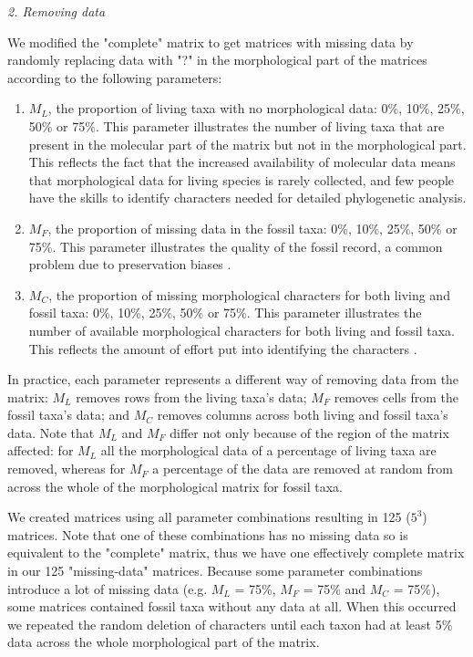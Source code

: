 \documentclass[12pt,letterpaper]{article}
\renewcommand{\subsection}[1]{%
\bigskip
\begin{center}
\begin{large}
\normalfont\itshape #1
\end{large}
\end{center}}
\begin{document}

\subsection{2. Removing data}
\label{Removing_data}
We modified the "complete" matrix to get matrices with missing data by randomly replacing data with "?" in the morphological part of the matrices according to the following parameters:
\begin{enumerate}
\item{$M_{L}$, the proportion of living taxa with no morphological data: 0\%, 10\%, 25\%, 50\% or 75\%.}
This parameter illustrates the number of living taxa that are present in the molecular part of the matrix but not in the morphological part. This reflects the fact that the increased availability of molecular data means that morphological data for living species is rarely collected, and few people have the skills to identify characters needed for detailed phylogenetic analysis.
\item{$M_{F}$, the proportion of missing data in the fossil taxa: 0\%, 10\%, 25\%, 50\% or 75\%.}
This parameter illustrates the quality of the fossil record, a common problem due to preservation biases \citep{sansomfossilization2013}. 
\item{$M_{C}$, the proportion of missing morphological characters for both living and fossil taxa: 0\%, 10\%, 25\%, 50\% or 75\%. }
This parameter illustrates the number of available morphological characters for both living and fossil taxa. This reflects the amount of effort put into identifying the characters \citep[e.g.][]{O'Leary08022013}.
\end{enumerate}

In practice, each parameter represents a different way of removing data from the matrix: $M_{L}$ removes rows from the living taxa's data; $M_{F}$ removes cells from the fossil taxa's data; and $M_{C}$ removes columns across both living and fossil taxa's data. Note that $M_{L}$ and $M_{F}$ differ not only because of the region of the matrix affected: for $M_{L}$ all the morphological data of a percentage of living taxa are removed, whereas for $M_{F}$ a percentage of the data are removed at random from across the whole of the morphological matrix for fossil taxa.

We created matrices using all parameter combinations resulting in 125 ($5^3$) matrices. Note that one of these combinations has no missing data so is equivalent to the "complete" matrix, thus we have one effectively complete matrix in our 125 "missing-data" matrices. Because some parameter combinations introduce a lot of missing data (e.g. $M_L$ = 75\%, $M_F$ = 75\% and $M_C$ = 75\%), some matrices contained fossil taxa without any data at all. When this occurred we repeated the random deletion of characters until each taxon had at least 5\% data across the whole morphological part of the matrix.
\end{document}
